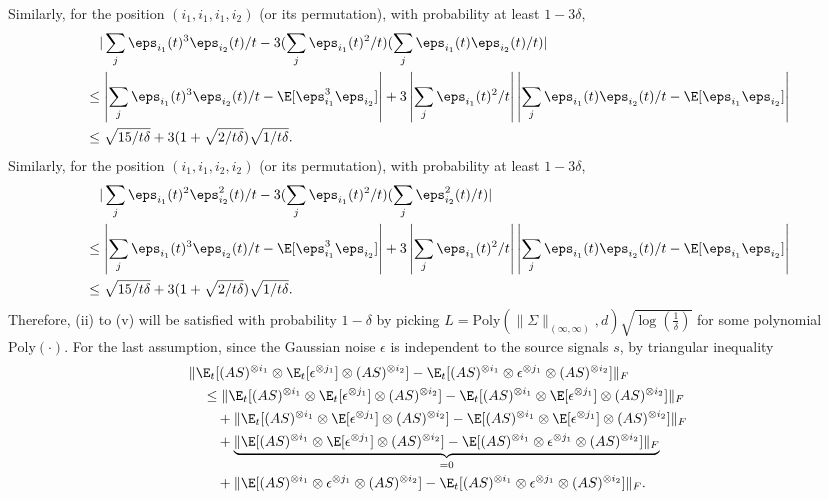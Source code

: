 Similarly, for the position $(i_1,i_1,i_1,i_2)$ (or its permutation), with probability at least $1-3\delta$,
\begin{align*}
&\quad |\sum_j \eps_{i_1}(t)^3\eps_{i_2}(t)/t - 3(\sum_j \eps_{i_1}(t)^2/t)(\sum_j \eps_{i_1}(t)\eps_{i_2}(t)/t)| \\
& \le \left|\sum_j \eps_{i_1}(t)^3\eps_{i_2}(t)/t -  \E[\eps_{i_1}^3 \eps_{i_2}]\right| +3\left|\sum_j \eps_{i_1}(t)^2/t\right|\left|\sum_j \eps_{i_1}(t)\eps_{i_2}(t)/t - \E[\eps_{i_1}\eps_{i_2}]\right| \\
& \le \sqrt{15/t\delta}+ 3(1+\sqrt{2/t\delta})\sqrt{1/t\delta}.
\end{align*}
Similarly, for the position $(i_1,i_1,i_2,i_2)$ (or its permutation), with probability at least $1-3\delta$,
\begin{align*}
&\quad |\sum_j \eps_{i_1}(t)^2\eps_{i_2}^2(t)/t - 3(\sum_j \eps_{i_1}(t)^2/t)(\sum_j \eps_{i_2}^2(t)/t)| \\
& \le \left|\sum_j \eps_{i_1}(t)^3\eps_{i_2}(t)/t -  \E[\eps_{i_1}^3 \eps_{i_2}]\right| +3\left|\sum_j \eps_{i_1}(t)^2/t\right|\left|\sum_j \eps_{i_1}(t)\eps_{i_2}(t)/t - \E[\eps_{i_1}\eps_{i_2}]\right| \\
& \le \sqrt{15/t\delta}+ 3(1+\sqrt{2/t\delta})\sqrt{1/t\delta}.
\end{align*}
Therefore, (ii) to (v) will be satisfied with probability $1-\delta$ by picking $L = \text{Poly}(\|\Sigma\|_{(\infty,\infty)}, d)\sqrt{\log(\frac{1}{\delta})}$ for some polynomial $\text{Poly}(\cdot)$.
\fi
For the last assumption, since the Gaussian noise $\epsilon$ is independent to the source signals $s$, by triangular inequality 
\begin{align*}
&\|\E_t[(AS)^{\otimes i_1}\otimes \E_t[\epsilon^{\otimes j_1}] \otimes (AS)^{\otimes i_2}] - \E_t[(AS)^{\otimes i_1}\otimes \epsilon^{\otimes j_1}\otimes (AS)^{\otimes i_2}]  \|_F \\
& \quad \le  \|\E_t[(AS)^{\otimes i_1}\otimes \E_t[\epsilon^{\otimes j_1}] \otimes (AS)^{\otimes i_2}] - \E_t[(AS)^{\otimes i_1}\otimes \E[\epsilon^{\otimes j_1}] \otimes (AS)^{\otimes i_2}] \|_F \\
& \quad \quad + \| \E_t[(AS)^{\otimes i_1}\otimes \E[\epsilon^{\otimes j_1}] \otimes (AS)^{\otimes i_2}] - \E[(AS)^{\otimes i_1}\otimes \E[\epsilon^{\otimes j_1}] \otimes (AS)^{\otimes i_2}] \|_F \\
& \quad \quad + \underbrace{\|\E[(AS)^{\otimes i_1}\otimes \E[\epsilon^{\otimes j_1}] \otimes (AS)^{\otimes i_2}]  - \E[(AS)^{\otimes i_1}\otimes \epsilon^{\otimes j_1}\otimes (AS)^{\otimes i_2}] \|_F}_{=0} \\
& \quad \quad + \| \E[(AS)^{\otimes i_1}\otimes \epsilon^{\otimes j_1}\otimes (AS)^{\otimes i_2}] - \E_t[(AS)^{\otimes i_1}\otimes \epsilon^{\otimes j_1}\otimes (AS)^{\otimes i_2}] \|_F.
\end{align*}
